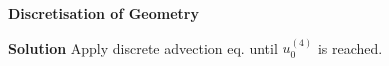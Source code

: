 \textbf{Discretisation of Geometry}


\textbf{Solution} Apply discrete advection eq. until $u_0^{(4)}$ is reached.
